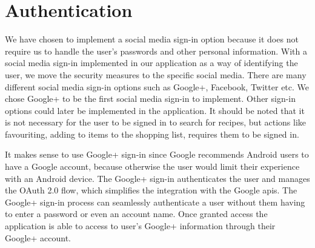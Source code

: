 \section{Authentication}
We have chosen to implement a social media sign-in option because it does not require us to handle the user's passwords and other personal information. With a social media sign-in implemented in our application as a way of identifying the user, we move the security measures to the specific social media.
There are many different social media sign-in options such as Google+, Facebook, Twitter etc. We chose Google+ to be the first social media sign-in to implement. Other sign-in options could later be implemented in the application. It should be noted that it is not necessary for the user to be signed in to search for recipes, but actions like favouriting, adding to items to the shopping list, requires them to be signed in.

It makes sense to use Google+ sign-in since Google recommends Android users to have a Google account, because otherwise the user would limit their experience with an Android device. 
The Google+ sign-in authenticates the user and manages the OAuth 2.0 flow, which simplifies the integration with the Google \ac{api}s.
The Google+ sign-in process can seamlessly authenticate a user without them having to enter a password or even an account name. 
Once granted access the application is able to access to user's Google+ information through their Google+ account\cite{googleplusvideo}.

